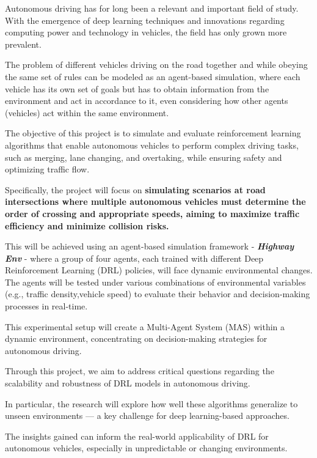 Autonomous driving has for long been a relevant and important field of study. With the emergence of deep learning techniques and innovations regarding computing power and technology in vehicles, the field has only grown more prevalent.

The problem of different vehicles driving on the road together and while obeying the same set of rules can be modeled as an agent-based simulation, where each vehicle has its own set of goals but has to obtain information from the environment and act in accordance to it, 
even considering how other agents (vehicles) act within the same environment.

The objective of this project is to simulate and evaluate reinforcement learning algorithms that enable autonomous vehicles to perform complex driving tasks,
such as merging, lane changing, and overtaking, while ensuring safety and optimizing traffic flow.

Specifically, the project will focus on \textbf{simulating scenarios at road intersections where multiple autonomous vehicles must determine the order of crossing
and appropriate speeds, aiming to maximize traffic efficiency and minimize collision risks.}

This will be achieved using an agent-based simulation framework - \textbf{\textit{Highway Env}}\cite{highwayenv} - where a group of four agents, each trained with different Deep Reinforcement Learning (DRL) policies, will face dynamic environmental changes. The agents will
be tested under various combinations of environmental variables (e.g., traffic density,vehicle speed) to evaluate their behavior and decision-making processes in real-time. 

This experimental setup will create a Multi-Agent System (MAS) within a dynamic environment, concentrating on decision-making strategies for autonomous driving.

Through this project, we aim to address critical questions regarding the scalability and robustness of DRL models in autonomous driving. 

In particular, the research will explore how well these algorithms generalize to unseen environments — a key challenge for deep learning-based approaches. 

The insights gained can inform the real-world applicability of DRL for autonomous vehicles, especially in unpredictable or changing environments.
